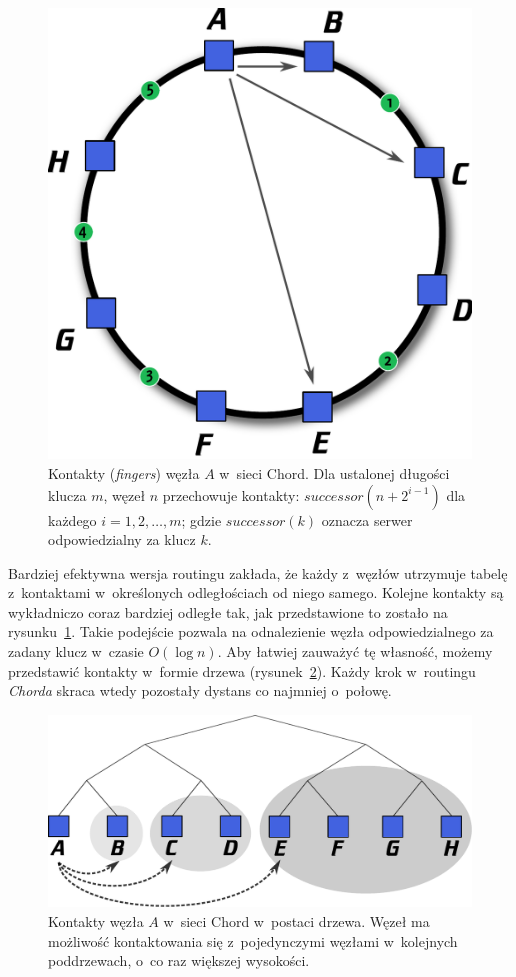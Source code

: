 \documentclass[a4paper,11pt]{scrartcl}
\begin{document}
\begin{figure}[h!]
\centering
\includegraphics[width=0.5\linewidth]{img/chord.pdf}
\caption{Kontakty (\textit{fingers}) węzła $A$ w~sieci Chord. Dla ustalonej długości klucza $m$, węzeł $n$ przechowuje kontakty: $successor(n + 2^{i-1})$ dla każdego $i = 1, 2, \dots,  m$; gdzie $successor(k)$ oznacza serwer odpowiedzialny za klucz $k$.}
\label{fig_chord_fingers_1}
\end{figure}

Bardziej efektywna wersja routingu zakłada, że każdy z~węzłów utrzymuje tabelę z~kontaktami w~określonych odległościach od niego samego. Kolejne kontakty są wykładniczo coraz bardziej odległe tak, jak przedstawione to zostało na rysunku~\ref{fig_chord_fingers_1}. Takie podejście pozwala na odnalezienie węzła odpowiedzialnego za zadany klucz w~czasie $O (\log n)$. Aby łatwiej zauważyć tę własność, możemy przedstawić kontakty w~formie drzewa (rysunek~\ref{fig_chord_fingers_2}). Każdy krok w~routingu \textit{Chorda} skraca wtedy pozostały dystans co najmniej o~połowę.


\begin{figure}[h!]
\centering
\includegraphics[width=0.9\linewidth]{img/chord_2.pdf}
\caption{Kontakty węzła $A$ w~sieci Chord w~postaci drzewa. Węzeł ma możliwość kontaktowania się z~pojedynczymi węzłami w~kolejnych poddrzewach, o~co raz większej wysokości.}
\label{fig_chord_fingers_2}
\end{figure}
\end{document}
